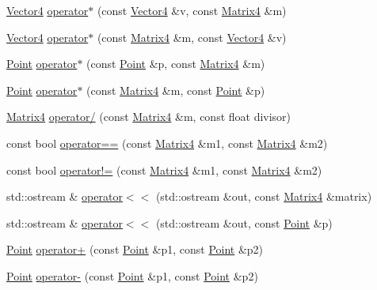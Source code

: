 \begin{DoxyCompactItemize}
\item 
\hyperlink{classprism_1_1_vector4}{Vector4} \hyperlink{namespaceprism_a5a10d8ea1e63b19d02bd294e4ebabb1b}{operator$\ast$} (const \hyperlink{classprism_1_1_vector4}{Vector4} \&v, const \hyperlink{classprism_1_1_matrix4}{Matrix4} \&m)
\item 
\hyperlink{classprism_1_1_vector4}{Vector4} \hyperlink{namespaceprism_ad125bd8304d577b6f879fb973f774eb8}{operator$\ast$} (const \hyperlink{classprism_1_1_matrix4}{Matrix4} \&m, const \hyperlink{classprism_1_1_vector4}{Vector4} \&v)
\item 
\hyperlink{classprism_1_1_point}{Point} \hyperlink{namespaceprism_a44373b8bda7131a90d04eef7e455ea6f}{operator$\ast$} (const \hyperlink{classprism_1_1_point}{Point} \&p, const \hyperlink{classprism_1_1_matrix4}{Matrix4} \&m)
\item 
\hyperlink{classprism_1_1_point}{Point} \hyperlink{namespaceprism_a82522932359d2381607cf1fe0c898011}{operator$\ast$} (const \hyperlink{classprism_1_1_matrix4}{Matrix4} \&m, const \hyperlink{classprism_1_1_point}{Point} \&p)
\item 
\hyperlink{classprism_1_1_matrix4}{Matrix4} \hyperlink{namespaceprism_a517b4bc9b0ccc23f79b744d93b540fa6}{operator/} (const \hyperlink{classprism_1_1_matrix4}{Matrix4} \&m, const float divisor)
\item 
const bool \hyperlink{namespaceprism_a8804ec2ab8dda9441d64e947f05e293c}{operator==} (const \hyperlink{classprism_1_1_matrix4}{Matrix4} \&m1, const \hyperlink{classprism_1_1_matrix4}{Matrix4} \&m2)
\item 
const bool \hyperlink{namespaceprism_a4d184994eec61a1511fc936a9facb69a}{operator!=} (const \hyperlink{classprism_1_1_matrix4}{Matrix4} \&m1, const \hyperlink{classprism_1_1_matrix4}{Matrix4} \&m2)
\item 
std\+::ostream \& \hyperlink{namespaceprism_ab65e15b3e601e0570beb49a11610c671}{operator$<$$<$} (std\+::ostream \&out, const \hyperlink{classprism_1_1_matrix4}{Matrix4} \&matrix)
\item 
std\+::ostream \& \hyperlink{namespaceprism_acb9fe7ab8ef5f1ee0338e3b057624393}{operator$<$$<$} (std\+::ostream \&out, const \hyperlink{classprism_1_1_point}{Point} \&p)
\item 
\hyperlink{classprism_1_1_point}{Point} \hyperlink{namespaceprism_a49e983b5c32c93114583309eda19dc2b}{operator+} (const \hyperlink{classprism_1_1_point}{Point} \&p1, const \hyperlink{classprism_1_1_point}{Point} \&p2)
\item 
\hyperlink{classprism_1_1_point}{Point} \hyperlink{namespaceprism_a505cbd94f024ad80136afe0b751da08a}{operator-\/} (const \hyperlink{classprism_1_1_point}{Point} \&p1, const \hyperlink{classprism_1_1_point}{Point} \&p2)

\end{DoxyCompactItemize}
